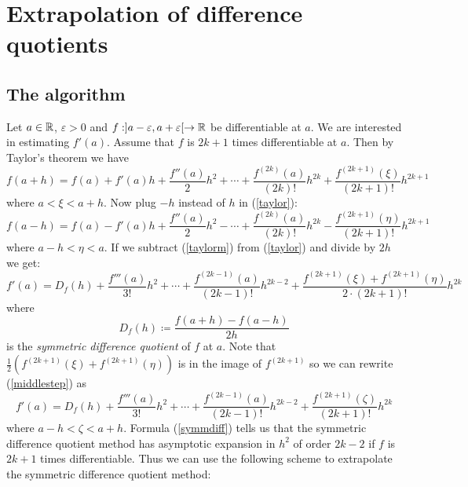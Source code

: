 \chapter{Extrapolation of difference quotients}

\section{The algorithm}

Let \(a\in \mathbb{R}\), \(\varepsilon > 0\) and \(f:]a - \varepsilon, a + \varepsilon [ \rightarrow \mathbb{R}\) be differentiable at \(a\). We are interested in estimating \(f'(a)\). Assume that \(f\) is \(2k+1\) times differentiable at \(a\). Then by Taylor's theorem we have 
\begin{equation}\label{taylor}
f(a + h) = f(a) + f'(a)h + \frac{f''(a)}{2}h^2 + \cdots + \frac{f^{(2k)}(a)}{(2k)!}h^{2k} + \frac{f^{(2k+1)}(\xi)}{(2k+1)!}h^{2k+1}
\end{equation}
where \(a < \xi < a + h\). Now plug \(-h\) instead of \(h\) in (\ref{taylor}):
\begin{equation}\label{taylorm}
f(a-h) = f(a) - f'(a)h + \frac{f''(a)}{2}h^2 - \cdots + \frac{f^{(2k)}(a)}{(2k)!}h^{2k} -  \frac{f^{(2k+1)}(\eta)}{(2k+1)!}h^{2k+1}
\end{equation}
where \(a - h < \eta < a\). If we subtract (\ref{taylorm}) from (\ref{taylor}) and divide by \(2h\) we get:
\begin{equation}\label{middlestep}
f'(a) = D_f(h) + \frac{f'''(a)}{3!}h^2 + \cdots + \frac{f^{(2k-1)}(a)}{(2k-1)!}h^{2k-2} + \frac{f^{(2k+1)}(\xi) + f^{(2k+1)}(\eta)}{2\cdot (2k+1)!}h^{2k}
\end{equation}
where
\begin{equation}
D_f(h) \coloneqq \frac{f(a+h) - f(a-h)}{2h}
\end{equation}
is the {\it symmetric difference quotient} of \(f\) at \(a\). Note that \(\frac{1}{2}(f^{(2k+1)}(\xi) + f^{(2k+1)}(\eta))\) is in the image of \(f^{(2k+1)}\) so we can rewrite (\ref{middlestep}) as 
\begin{equation}\label{symmdiff}
f'(a) = D_f(h) + \frac{f'''(a)}{3!}h^2 + \cdots + \frac{f^{(2k-1)}(a)}{(2k-1)!}h^{2k-2} + \frac{f^{(2k+1)}(\zeta)}{(2k+1)!}h^{2k}
\end{equation}
where \(a-h < \zeta < a + h\). Formula (\ref{symmdiff}) tells us that the symmetric difference quotient method has asymptotic expansion in \(h^2\) of order \(2k-2\) if \(f\) is \(2k+1\) times differentiable. Thus we can use the following scheme to extrapolate the symmetric difference quotient method:

